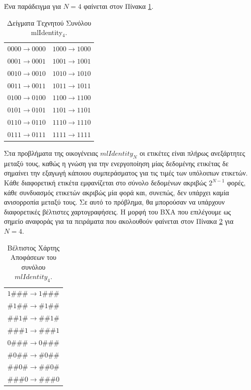  Ένα παράδειγμα για $N=4$ φαίνεται στον Πίνακα \ref{table:mliden4Elements}.

\begin{table}[htbp]
\caption{Δείγματα Τεχνητού Συνόλου mlIdentity$_4$.}
\label{table:mliden4Elements}
\begin{center}
\begin{tabular}{l|l}
$0000\rightarrow 0000$ & $1000 \rightarrow 1000$\\
$0001\rightarrow 0001$ & $1001 \rightarrow 1001$\\
$0010\rightarrow 0010$ & $1010 \rightarrow 1010$\\
$0011\rightarrow 0011$ & $1011 \rightarrow 1011$\\
$0100\rightarrow 0100$ & $1100 \rightarrow 1100$\\
$0101\rightarrow 0101$ & $1101 \rightarrow 1101$\\
$0110\rightarrow 0110$ & $1110 \rightarrow 1110$\\
$0111\rightarrow 0111$ & $1111 \rightarrow 1111$
\end{tabular}
\end{center}
\end{table}

Στα προβλήματα της οικογένειας $mlIdentity_{N}$ οι ετικέτες είναι πλήρως ανεξάρτητες μεταξύ τους, καθώς η γνώση για την ενεργοποίηση μίας δεδομένης ετικέτας δε σημαίνει την εξαγωγή κάποιου συμπεράσματος για τις τιμές των υπόλοιπων ετικετών. Κάθε διαφορετική ετικέτα εμφανίζεται στο σύνολο δεδομένων ακριβώς $2^{N-1}$ φορές, κάθε συνδυασμός ετικετών ακριβώς μία φορά και, συνεπώς, δεν υπάρχει καμία ανισορροπία μεταξύ τους. Σε αυτό το πρόβλημα, θα μπορούσαν να υπάρχουν διαφορετικές βέλτιστες χαρτογραφήσεις. Η μορφή του ΒΧΑ που επιλέγουμε ως σημείο αναφοράς για τα πειράματα που ακολουθούν φαίνεται στον Πίνακα \ref{table:mliden4ΒΑΜ} για $N=4$.


\begin{table}[htbp]
\caption{Βέλτιστος Χάρτης Αποφάσεων του συνόλου $mlIdentity_{4}$.}
\label{table:mliden4ΒΑΜ}
\begin{center}
\begin{tabular}{l}
$1\#\#\# \rightarrow 1\#\#\#$ \\
$\#1\#\# \rightarrow \#1\#\#$ \\
$\#\#1\# \rightarrow \#\#1\#$ \\
$\#\#\#1 \rightarrow \#\#\#1$ \\
$0\#\#\# \rightarrow 0\#\#\#$ \\
$\#0\#\# \rightarrow \#0\#\#$ \\
$\#\#0\# \rightarrow \#\#0\#$ \\
$\#\#\#0 \rightarrow \#\#\#0$ 
\end{tabular}
\end{center}
\end{table}

